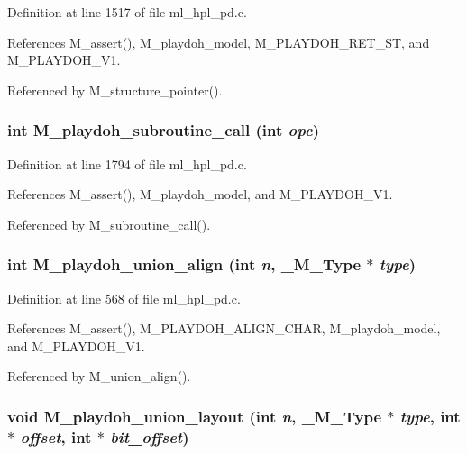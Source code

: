 Definition at line 1517 of file ml\_\-hpl\_\-pd.c.

References M\_\-assert(), M\_\-playdoh\_\-model, M\_\-PLAYDOH\_\-RET\_\-ST, and M\_\-PLAYDOH\_\-V1.

Referenced by M\_\-structure\_\-pointer().
\subsubsection{\setlength{\rightskip}{0pt plus 5cm}int M\_\-playdoh\_\-subroutine\_\-call (int {\em opc})}\label{ml__hpl__pd_8c_71079daa25f97ae94201913119a1a1b8}




Definition at line 1794 of file ml\_\-hpl\_\-pd.c.

References M\_\-assert(), M\_\-playdoh\_\-model, and M\_\-PLAYDOH\_\-V1.

Referenced by M\_\-subroutine\_\-call().
\subsubsection{\setlength{\rightskip}{0pt plus 5cm}int M\_\-playdoh\_\-union\_\-align (int {\em n}, \bf{\_\-M\_\-Type} $\ast$ {\em type})}\label{ml__hpl__pd_8c_d8dae1943e72b94fa5bc2a12bae63d56}




Definition at line 568 of file ml\_\-hpl\_\-pd.c.

References M\_\-assert(), M\_\-PLAYDOH\_\-ALIGN\_\-CHAR, M\_\-playdoh\_\-model, and M\_\-PLAYDOH\_\-V1.

Referenced by M\_\-union\_\-align().
\subsubsection{\setlength{\rightskip}{0pt plus 5cm}void M\_\-playdoh\_\-union\_\-layout (int {\em n}, \bf{\_\-M\_\-Type} $\ast$ {\em type}, int $\ast$ {\em offset}, int $\ast$ {\em bit\_\-offset})}\label{ml__hpl__pd_8c_a1215ef769852204c83875900623c433}




